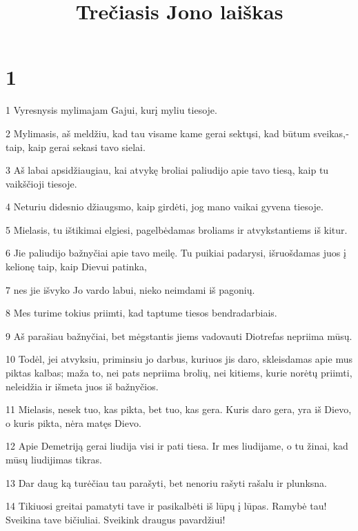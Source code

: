 

\title{Trečiasis Jono laiškas}

\chapter{1}


\par 1 Vyresnysis mylimajam Gajui, kurį myliu tiesoje. 
\par 2 Mylimasis, aš meldžiu, kad tau visame kame gerai sektųsi, kad būtum sveikas,­taip, kaip gerai sekasi tavo sielai. 
\par 3 Aš labai apsidžiaugiau, kai atvykę broliai paliudijo apie tavo tiesą, kaip tu vaikščioji tiesoje. 
\par 4 Neturiu didesnio džiaugsmo, kaip girdėti, jog mano vaikai gyvena tiesoje. 
\par 5 Mielasis, tu ištikimai elgiesi, pagelbėdamas broliams ir atvykstantiems iš kitur. 
\par 6 Jie paliudijo bažnyčiai apie tavo meilę. Tu puikiai padarysi, išruošdamas juos į kelionę taip, kaip Dievui patinka, 
\par 7 nes jie išvyko Jo vardo labui, nieko neimdami iš pagonių. 
\par 8 Mes turime tokius priimti, kad taptume tiesos bendradarbiais. 
\par 9 Aš parašiau bažnyčiai, bet mėgstantis jiems vadovauti Diotrefas nepriima mūsų. 
\par 10 Todėl, jei atvyksiu, priminsiu jo darbus, kuriuos jis daro, skleisdamas apie mus piktas kalbas; maža to, nei pats nepriima brolių, nei kitiems, kurie norėtų priimti, neleidžia ir išmeta juos iš bažnyčios. 
\par 11 Mielasis, nesek tuo, kas pikta, bet tuo, kas gera. Kuris daro gera, yra iš Dievo, o kuris pikta, nėra matęs Dievo. 
\par 12 Apie Demetriją gerai liudija visi ir pati tiesa. Ir mes liudijame, o tu žinai, kad mūsų liudijimas tikras. 
\par 13 Dar daug ką turėčiau tau parašyti, bet nenoriu rašyti rašalu ir plunksna. 
\par 14 Tikiuosi greitai pamatyti tave ir pasikalbėti iš lūpų į lūpas. Ramybė tau! Sveikina tave bičiuliai. Sveikink draugus pavardžiui!



